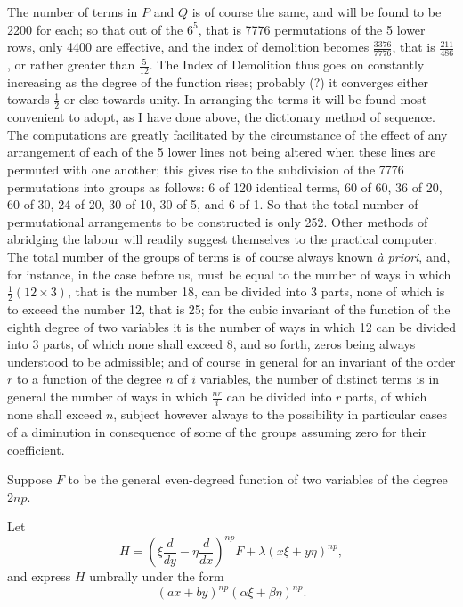 \documentclass[11pt]{article}
\begin{document}
{{{The number of terms in $P$ and $Q$ is of course the same, and will be found to be 2200 for each; so that out of the $6^5$, that is 7776 permutations of the 5 lower rows, only 4400 are effective, and the index of demolition becomes $\frac{3376}{7776}$, that is $\frac{211}{486}$, or rather greater than $\frac{5}{12}$. The Index of Demolition thus goes on constantly increasing as the degree of the function rises; probably (?) it converges either towards $\frac12$ or else towards unity. In arranging the terms it will be found most convenient to adopt, as I have done above, the dictionary method of sequence. The computations are greatly facilitated by the circumstance of the effect of any arrangement of each of the 5 lower lines not being altered when these lines are permuted with one another; this gives rise to the subdivision of the 7776 permutations into groups as follows: 6 of 120 identical terms, 60 of 60, 36 of 20, 60 of 30, 24 of 20, 30 of 10, 30 of 5, and 6 of 1. So that the total number of permutational arrangements to be constructed is only 252. Other methods of abridging the labour will readily suggest themselves to the practical computer. The total number of the groups of terms is of course always known \emph{à priori}, and, for instance, in the case before us, must be equal to the number of ways in which $\frac12(12\times3)$, that is the number 18, can be divided into 3 parts, none of which is to exceed the number 12, that is 25; for the cubic invariant of the function of the eighth degree of two variables it is the number of ways in which 12 can be divided into 3 parts, of which none shall exceed 8, and so forth, zeros being always understood to be admissible; and of course in general for an invariant of the order $r$ to a function of the degree $n$ of $i$ variables, the number of distinct terms is in general the number of ways in which $\frac{nr}{i}$ can be divided into $r$ parts, of which none shall exceed $n$, subject however always to the possibility in particular cases of a diminution in consequence of some of the groups assuming zero for their coefficient.}

Suppose $F$ to be the general even-degreed function of two variables of the degree $2np$.

Let
\[
H=\left(\xi\frac{d}{dy}-\eta\frac{d}{dx}\right)^{np}F+\lambda(x\xi+y\eta)^{np},
\]
and express $H$ umbrally under the form
\[
(ax+by)^{np}(\alpha\xi+\beta\eta)^{np}.
\]

}}
\end{document}

